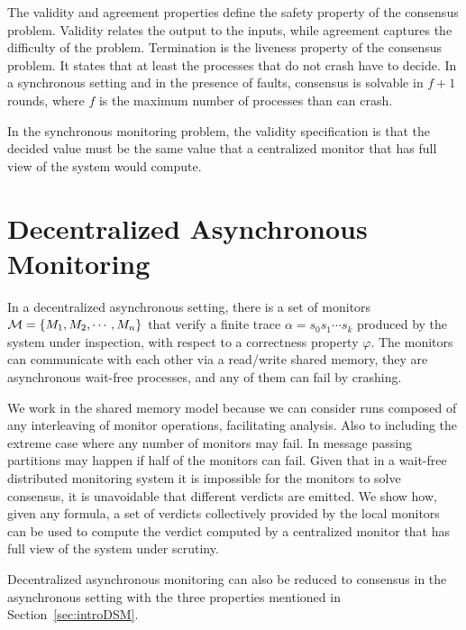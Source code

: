 The validity and agreement properties define the safety property of the 
consensus problem. Validity relates the output to the inputs, while agreement 
captures the difficulty of the problem. Termination is the liveness property of 
the consensus problem. It states that at least the processes that do not crash 
have to decide. In a synchronous setting and in the presence of faults, 
consensus is solvable in $f+1$ rounds, where $f$ is the maximum number of 
processes than can crash.

In the synchronous monitoring problem, the validity specification is that the 
decided value must be the same value that a centralized monitor that has full 
view of the system would compute.

\section{Decentralized Asynchronous Monitoring}

In a decentralized asynchronous setting, there is a set of monitors 
\linebreak $\mathcal{M} =\{M_1, M_2, \cdots , M_n\}$ that verify a finite trace 
$\alpha = s_0 s_1 \cdots s_k$ produced by the system under inspection, with 
respect to a correctness property $\varphi$. The monitors can communicate with 
each other via a read/write shared memory, they are asynchronous wait-free 
processes, and any of them can fail by crashing.

We work in the shared memory model because we can consider runs composed 
of any interleaving of monitor operations, facilitating analysis. Also to 
including the extreme case where any number of monitors may fail. In message 
passing partitions may happen if half of the monitors can fail. Given that in 
a wait-free distributed monitoring system it is impossible for the monitors to 
solve consensus, it is unavoidable that different verdicts are emitted. We show 
how, given any \LTL formula, a set of verdicts collectively provided by the 
local monitors can be used to compute the verdict computed by a centralized 
monitor that has full view of the system under scrutiny.

Decentralized asynchronous monitoring can also be reduced to consensus in the 
asynchronous setting with the three properties mentioned in 
Section~\ref{sec:introDSM}.

